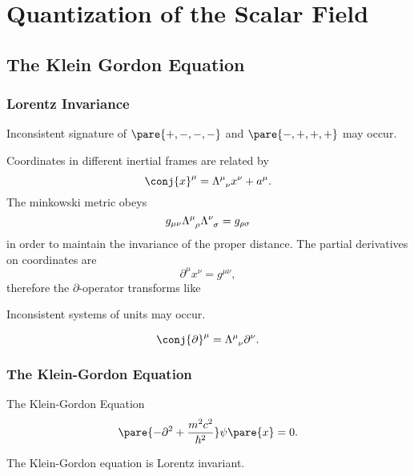 \documentclass[hidelinks]{article}
\begin{document}
\section{Quantization of the Scalar Field} %
\label{sec:quantization_of_scalar_field}

\subsection{The Klein Gordon Equation} %
\label{sub:the_klein_gordon_equation}

\subsubsection{Lorentz Invariance} %
\label{ssub:lorentz_invariance}

\begin{marginwarns}
    Inconsistent signature of $\pare{+,-,-,-}$ and $\pare{-,+,+,+}$ may occur.
\end{marginwarns}
Coordinates in different inertial frames are related by
\[ \conj{x}^\mu = \tensor{\Lambda}{^\mu_\nu} x^\nu + a^\mu. \]
The minkowski metric obeys
\[ g_{\mu\nu} \tensor{\Lambda}{^\mu_\rho}\tensor{\Lambda}{^\nu_\sigma} = g_{\rho\sigma} \]
in order to maintain the invariance of the proper distance. The partial derivatives on coordinates are
\[ \partial^\mu x^\nu = g^{\mu\nu}, \]
therefore the $\partial$-operator transforms like \begin{marginwarns}
    Inconsistent systems of units may occur.
\end{marginwarns}
\[ \conj{\partial}^\mu = \tensor{\Lambda}{^\mu_\nu} \partial^\nu. \]


\subsubsection{The Klein-Gordon Equation} %
\label{ssub:the_klein_gordon_equation}

\begin{finaleq}{The Klein-Gordon Equation}
    \begin{equation}
        \label{eq:the_klein-gordon-equation}
        \pare{-\partial^2 + \frac{m^2c^2}{\hbar^2}}\psi\pare{x} = 0.
    \end{equation}
\end{finaleq}
The Klein-Gordon equation is Lorentz invariant.

\end{document}

